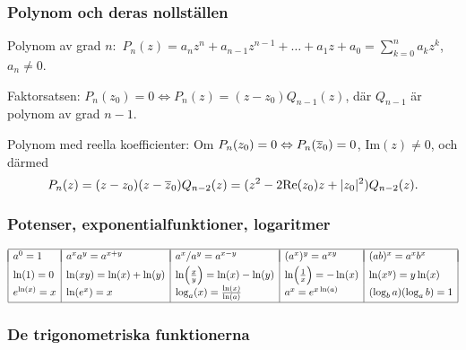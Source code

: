 \documentclass{article}
\begin{document}
\vspace{-1em}

\subsubsection*{Polynom och deras nollställen} %
Polynom av grad $n$:\, $P_n(z)
   =a_nz^n+a_{n-1}z^{n-1}+\dots+a_1z+a_0
   =\sum_{k=0}^n a_kz^k$, 
   $a_n\neq 0$.

Faktorsatsen: $P_n(z_0)=0 \iff P_n(z) = (z-z_0)Q_{n-1}(z)$, där $Q_{n-1}$ är
polynom av grad $n-1$.

\bigskip

   Polynom med reella koefficienter: 
   Om $P_n(z_0)=0\Leftrightarrow P_n(\overline z_0)=0$, $\text{Im}(z)\neq0$, och därmed
   $$
   P_n(z)
    =(z-z_0)(z-\overline z_0)Q_{n-2}(z)
    =(z^2-2\text{Re}(z_0)z +|z_0|^2)Q_{n-2}(z).
   $$%

\subsubsection*{Potenser, exponentialfunktioner, logaritmer}%


$\begin{array}{|l|l|l|l|l|}\hline
  &&&&\\*[-11pt]
  a^0=1 &a^xa^y=a^{x+y} &
  a^x/a^y=a^{x-y}&(a^x)^y=a^{xy} 
  & (ab)^x=a^xb^x 
\EndRow
  \ln(1)=0 &\ln(xy)=\ln(x)+\ln(y) &\ln\Bigl(\frac{x}{y}\Bigr)
  =\ln(x)-\ln(y) & 
  \ln\Bigl(\frac1x\Bigr) = -\ln(x) &
  \ln(x^y)=y\ln(x) 
\EndRow 
  e^{\ln(x)}=x & \ln(e^x)=x & \log_a(x)
  =\frac{\ln(x)}{\ln(a)} & a^x=e^{x\ln(a)} & 
  (\log_ba)(\log_ab) = 1
\EndRow
\hline\end{array}$%

\subsubsection*{De trigonometriska funktionerna}%
\end{document}
